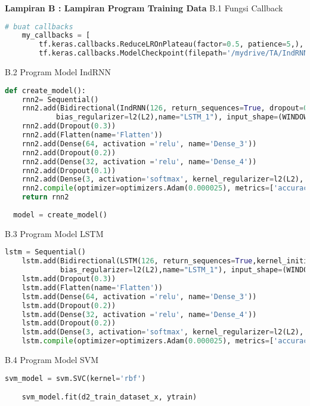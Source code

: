 \textbf{Lampiran B : Lampiran Program Training Data}
B.1 Fungsi Callback
\begin{lstlisting}[language=Python]
    # buat callbacks
    my_callbacks = [
        tf.keras.callbacks.ReduceLROnPlateau(factor=0.5, patience=5,),
        tf.keras.callbacks.ModelCheckpoint(filepath='/mydrive/TA/IndRNNaug_best.h5', save_best_only=True)]
\end{lstlisting}

B.2 Program Model IndRNN
\begin{lstlisting}[language=Python]
    def create_model():
    rnn2= Sequential()
    rnn2.add(Bidirectional(IndRNN(126, return_sequences=True, dropout=0.0, recurrent_dropout=0.0, kernel_initializer='orthogonal', kernel_regularizer=l2(L2), recurrent_regularizer=l2(L2),
            bias_regularizer=l2(L2),name="LSTM_1"), input_shape=(WINDOW_LEN, N_FEATURE)))
    rnn2.add(Dropout(0.3))
    rnn2.add(Flatten(name='Flatten'))
    rnn2.add(Dense(64, activation ='relu', name='Dense_3'))
    rnn2.add(Dropout(0.2))
    rnn2.add(Dense(32, activation ='relu', name='Dense_4'))
    rnn2.add(Dropout(0.1))
    rnn2.add(Dense(3, activation='softmax', kernel_regularizer=l2(L2), bias_regularizer=l2(L2)))
    rnn2.compile(optimizer=optimizers.Adam(0.000025), metrics=['accuracy'], loss='categorical_crossentropy')
    return rnn2
  
  model = create_model()
\end{lstlisting}

B.3 Program Model LSTM
\begin{lstlisting}[language=Python]
    lstm = Sequential()
    lstm.add(Bidirectional(LSTM(126, return_sequences=True,kernel_initializer='orthogonal', kernel_regularizer=l2(L2), recurrent_regularizer=l2(L2),
             bias_regularizer=l2(L2),name="LSTM_1"), input_shape=(WINDOW_LEN, N_FEATURE)))
    lstm.add(Dropout(0.3))
    lstm.add(Flatten(name='Flatten'))
    lstm.add(Dense(64, activation ='relu', name='Dense_3'))
    lstm.add(Dropout(0.2))
    lstm.add(Dense(32, activation ='relu', name='Dense_4'))
    lstm.add(Dropout(0.2))
    lstm.add(Dense(3, activation='softmax', kernel_regularizer=l2(L2), bias_regularizer=l2(L2)))
    lstm.compile(optimizer=optimizers.Adam(0.000025), metrics=['accuracy'], loss='categorical_crossentropy')
\end{lstlisting}

B.4 Program Model SVM
\begin{lstlisting}[language=Python]
    svm_model = svm.SVC(kernel='rbf')

    svm_model.fit(d2_train_dataset_x, ytrain)
\end{lstlisting}

